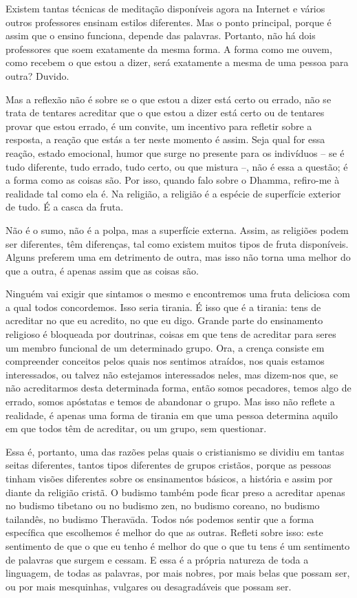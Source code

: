 Existem tantas técnicas de meditação disponíveis agora na Internet e vários
outros professores ensinam estilos diferentes. Mas o ponto principal, porque é
assim que o ensino funciona, depende das palavras. Portanto, não há dois
professores que soem exatamente da mesma forma. A forma como me ouvem, como
recebem o que estou a dizer, será exatamente a mesma de uma pessoa para outra?
Duvido.

Mas a reflexão não é sobre se o que estou a dizer está certo ou errado, não se
trata de tentares acreditar que o que estou a dizer está certo ou de tentares
provar que estou errado, é um convite, um incentivo para refletir sobre a
resposta, a reação que estás a ter neste momento é assim. Seja qual for essa
reação, estado emocional, humor que surge no presente para os indivíduos -- se é
tudo diferente, tudo errado, tudo certo, ou que mistura --, não é essa a
questão; é a forma como as coisas são. Por isso, quando falo sobre o Dhamma,
refiro-me à realidade tal como ela é. Na religião, a religião é a espécie de
superfície exterior de tudo. É a casca da fruta.

Não é o sumo, não é a polpa, mas a superfície externa. Assim, as religiões podem
ser diferentes, têm diferenças, tal como existem muitos tipos de fruta
disponíveis. Alguns preferem uma em detrimento de outra, mas isso não torna uma
melhor do que a outra, é apenas assim que as coisas são.

Ninguém vai exigir que sintamos o mesmo e encontremos uma fruta deliciosa com a
qual todos concordemos. Isso seria tirania. É isso que é a tirania: tens de
acreditar no que eu acredito, no que eu digo. Grande parte do ensinamento
religioso é bloqueada por doutrinas, coisas em que tens de acreditar para seres
um membro funcional de um determinado grupo. Ora, a crença consiste em
compreender conceitos pelos quais nos sentimos atraídos, nos quais estamos
interessados, ou talvez não estejamos interessados neles, mas dizem-nos que, se
não acreditarmos desta determinada forma, então somos pecadores, temos algo de
errado, somos apóstatas e temos de abandonar o grupo. Mas isso não reflete a
realidade, é apenas uma forma de tirania em que uma pessoa determina aquilo em
que todos têm de acreditar, ou um grupo, sem questionar.

Essa é, portanto, uma das razões pelas quais o cristianismo se dividiu em tantas
seitas diferentes, tantos tipos diferentes de grupos cristãos, porque as pessoas
tinham visões diferentes sobre os ensinamentos básicos, a história e assim por
diante da religião cristã. O budismo também pode ficar preso a acreditar apenas
no budismo tibetano ou no budismo zen, no budismo coreano, no budismo tailandês,
no budismo Theravāda. Todos nós podemos sentir que a forma específica que
escolhemos é melhor do que as outras. Refleti sobre isso: este sentimento de que
o que eu tenho é melhor do que o que tu tens é um sentimento de palavras que
surgem e cessam. E essa é a própria natureza de toda a linguagem, de todas as
palavras, por mais nobres, por mais belas que possam ser, ou por mais
mesquinhas, vulgares ou desagradáveis que possam ser.

